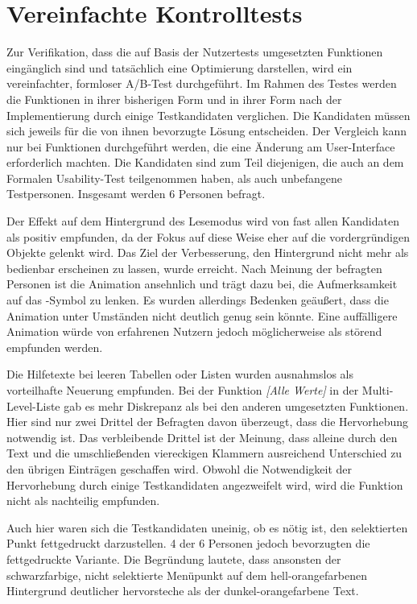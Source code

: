 \section{Vereinfachte Kontrolltests} \label{sec:optiQuality}
Zur Verifikation, dass die auf Basis der Nutzertests umgesetzten Funktionen eingänglich sind und tatsächlich eine Optimierung darstellen, wird ein vereinfachter, formloser A/B-Test durchgeführt. Im Rahmen des Testes werden die Funktionen in ihrer bisherigen Form und in ihrer Form nach der Implementierung durch einige Testkandidaten verglichen. Die Kandidaten müssen sich jeweils für die von ihnen bevorzugte Lösung entscheiden. Der Vergleich kann nur bei Funktionen durchgeführt werden, die eine Änderung am User-Interface erforderlich machten. Die Kandidaten sind zum Teil diejenigen, die auch an dem Formalen Usability-Test teilgenommen haben, als auch unbefangene Testpersonen. Insgesamt werden 6 Personen befragt.\par
{}
Der Effekt auf dem Hintergrund des Lesemodus wird von fast allen Kandidaten als positiv empfunden, da der Fokus auf diese Weise eher auf die vordergründigen Objekte gelenkt wird. Das Ziel der Verbesserung, den Hintergrund nicht mehr als bedienbar erscheinen zu lassen, wurde erreicht.
Nach Meinung der befragten Personen ist die Animation ansehnlich und trägt dazu bei, die Aufmerksamkeit auf das -Symbol zu lenken. Es wurden allerdings Bedenken geäußert, dass die Animation unter Umständen nicht deutlich genug sein könnte. Eine auffälligere Animation würde von erfahrenen Nutzern jedoch möglicherweise als störend empfunden werden.\par
{}
Die Hilfetexte bei leeren Tabellen oder Listen wurden ausnahmslos als vorteilhafte Neuerung empfunden.
Bei der Funktion \textit{[Alle Werte]} in der Multi-Level-Liste gab es mehr Diskrepanz als bei den anderen umgesetzten Funktionen. Hier sind nur zwei Drittel der Befragten davon überzeugt, dass die Hervorhebung notwendig ist. Das verbleibende Drittel ist der Meinung, dass alleine durch den Text und die umschließenden viereckigen Klammern ausreichend Unterschied zu den übrigen Einträgen geschaffen wird. Obwohl die Notwendigkeit der Hervorhebung durch einige Testkandidaten angezweifelt wird, wird die Funktion nicht als nachteilig empfunden.\par
{}
Auch hier waren sich die Testkandidaten uneinig, ob es nötig ist, den selektierten Punkt fettgedruckt darzustellen. 4 der 6 Personen jedoch bevorzugten die fettgedruckte Variante. Die Begründung lautete, dass ansonsten der schwarzfarbige, nicht selektierte Menüpunkt auf dem hell-orangefarbenen Hintergrund deutlicher hervorsteche als der dunkel-orangefarbene Text.\par
